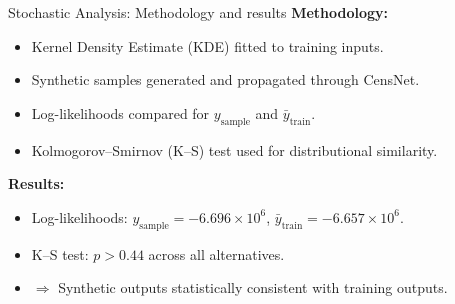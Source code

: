 \documentclass[hyperref={colorlinks,citecolor=blue,linkcolor=blue,urlcolor=blue}]{beamer}
\begin{document}


\begin{frame}{Stochastic Analysis: Methodology and results}
\footnotesize
    \textbf{Methodology:}
    \begin{itemize}
        \item Kernel Density Estimate (KDE) fitted to training inputs.
        \item Synthetic samples generated and propagated through CensNet.
        \item Log-likelihoods compared for $y_{\text{sample}}$ and $\bar{y}_{\text{train}}$.
        \item Kolmogorov–Smirnov (K–S) test used for distributional similarity.
    \end{itemize}

    \vspace{0.5em}
    \textbf{Results:}
    \begin{itemize}
        \item Log-likelihoods: $y_{\text{sample}} = -6.696 \times 10^6$, 
              $\bar{y}_{\text{train}} = -6.657 \times 10^6$.
        \item K–S test: $p > 0.44$ across all alternatives.
        \item $\Rightarrow$ Synthetic outputs statistically consistent with training outputs.
    \end{itemize}

\end{frame}
\end{document}
